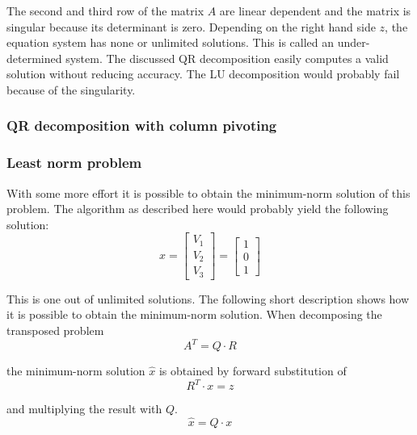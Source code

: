 The second and third row of the matrix $A$ are linear dependent and
the matrix is singular because its determinant is zero.  Depending on
the right hand side $z$, the equation system has none or unlimited
solutions.  This is called an under-determined system.  The discussed
QR decomposition easily computes a valid solution without reducing
accuracy.  The LU decomposition would probably fail because of the
singularity.

\subsubsection{QR decomposition with column pivoting}

\subsubsection{Least norm problem}

With some more effort it is possible to obtain the minimum-norm
solution of this problem.  The algorithm as described here would
probably yield the following solution:
\begin{equation}
x =
\begin{bmatrix}
V_1\\
V_2\\
V_3
\end{bmatrix}
=
\begin{bmatrix}
1\\
0\\
1
\end{bmatrix}
\end{equation}

This is one out of unlimited solutions.  The following short
description shows how it is possible to obtain the minimum-norm
solution.  When decomposing the transposed problem
\begin{equation}
A^T = Q\cdot R
\end{equation}

the minimum-norm solution $\hat{x}$ is obtained by forward substitution of
\begin{equation}
R^T\cdot x = z
\end{equation}

and multiplying the result with $Q$.
\begin{equation}
\hat{x} = Q\cdot x
\end{equation}

